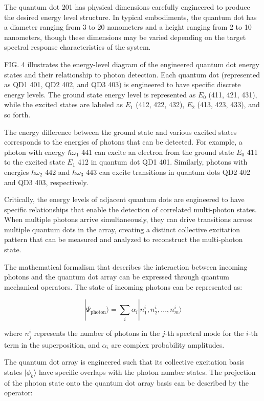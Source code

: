 \documentclass[12pt,letterpaper]{article}
\begin{document}
The quantum dot 201 has physical dimensions carefully engineered to produce the desired energy level structure. In typical embodiments, the quantum dot has a diameter ranging from 3 to 20 nanometers and a height ranging from 2 to 10 nanometers, though these dimensions may be varied depending on the target spectral response characteristics of the system.

FIG. 4 illustrates the energy-level diagram of the engineered quantum dot energy states and their relationship to photon detection. Each quantum dot (represented as QD1 401, QD2 402, and QD3 403) is engineered to have specific discrete energy levels. The ground state energy level is represented as $E_0$ (411, 421, 431), while the excited states are labeled as $E_1$ (412, 422, 432), $E_2$ (413, 423, 433), and so forth. 

The energy difference between the ground state and various excited states corresponds to the energies of photons that can be detected. For example, a photon with energy $\hbar\omega_1$ 441 can excite an electron from the ground state $E_0$ 411 to the excited state $E_1$ 412 in quantum dot QD1 401. Similarly, photons with energies $\hbar\omega_2$ 442 and $\hbar\omega_3$ 443 can excite transitions in quantum dots QD2 402 and QD3 403, respectively.

Critically, the energy levels of adjacent quantum dots are engineered to have specific relationships that enable the detection of correlated multi-photon states. When multiple photons arrive simultaneously, they can drive transitions across multiple quantum dots in the array, creating a distinct collective excitation pattern that can be measured and analyzed to reconstruct the multi-photon state.

The mathematical formalism that describes the interaction between incoming photons and the quantum dot array can be expressed through quantum mechanical operators. The state of incoming photons can be represented as:

$$|\Psi_{\text{photon}}\rangle = \sum_i \alpha_i |n_1^i, n_2^i, ..., n_m^i\rangle$$

where $n_j^i$ represents the number of photons in the $j$-th spectral mode for the $i$-th term in the superposition, and $\alpha_i$ are complex probability amplitudes. 

The quantum dot array is engineered such that its collective excitation basis states $|\phi_k\rangle$ have specific overlaps with the photon number states. The projection of the photon state onto the quantum dot array basis can be described by the operator:
\end{document}
